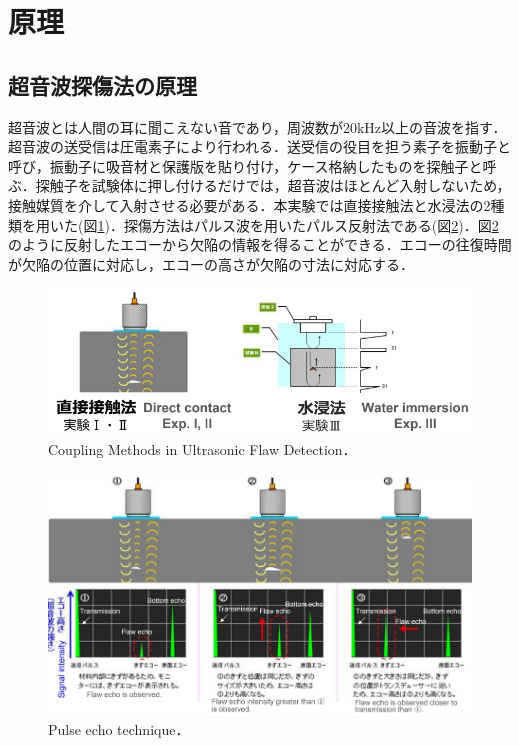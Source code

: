 \section{原理}

\subsection{超音波探傷法の原理}
超音波とは人間の耳に聞こえない音であり，周波数が20kHz以上の音波を指す．超音波の送受信は圧電素子により行われる．送受信の役目を担う素子を振動子と呼び，振動子に吸音材と保護版を貼り付け，ケース格納したものを探触子と呼ぶ．探触子を試験体に押し付けるだけでは，超音波はほとんど入射しないため，接触媒質を介して入射させる必要がある．本実験では直接接触法と水浸法の2種類を用いた(図\ref{fig:カップリング})．探傷方法はパルス波を用いたパルス反射法である(図\ref{fig:パルス反射法})．図\ref{fig:パルス反射法}のように反射したエコーから欠陥の情報を得ることができる．エコーの往復時間が欠陥の位置に対応し，エコーの高さが欠陥の寸法に対応する．

\begin{figure}[htbp]
    \centering %
    \includegraphics[width=100truemm,clip]{fig/fig_測定方式.png}
    \caption{Coupling Methods in Ultrasonic Flaw Detection．}
    \label{fig:カップリング}
\end{figure}

\begin{figure}[htbp]
    \centering %
    \includegraphics[width=100truemm,clip]{fig/fig_探傷法.png}
    \caption{Pulse echo technique．}
    \label{fig:パルス反射法}
\end{figure}

